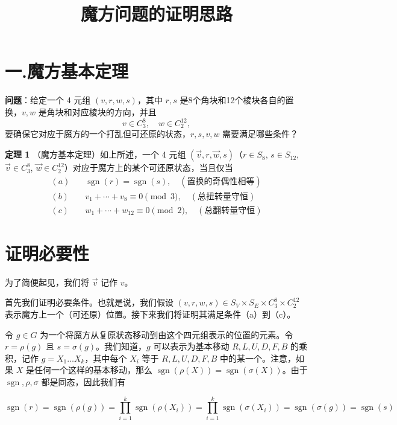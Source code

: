 \documentclass{article}
\title{魔方问题的证明思路}
\author{}
\date{}
\begin{document}
\maketitle

\section*{一.魔方基本定理}

\textbf{问题}：给定一个 4 元组 \( (v, r, w, s) \)，其中 \( r, s \) 是8个角块和12个棱块各自的置换，\( v, w \) 是角块和对应棱块的方向，并且
\[
v \in C_3^8, \quad w \in C_2^{12},
\]
要确保它对应于魔方的一个打乱但可还原的状态，\( r, s, v, w \) 需要满足哪些条件？



\textbf{定理 1} （魔方基本定理）如上所述，一个 4 元组 \( (\vec{v}, r, \vec{w}, s) \)（\( r \in S_8 \), \( s \in S_{12} \), \( \vec{v} \in C_3^8 \), \( \vec{w} \in C_2^{12} \)）对应于魔方上的某个可还原状态，当且仅当
\[
\begin{aligned}
(a) &\quad \operatorname{sgn}(r) = \operatorname{sgn}(s), \quad (\text{置换的奇偶性相等}) \\
(b) &\quad v_1 + \cdots + v_8 \equiv 0 \pmod{3}, \quad (\text{总扭转量守恒}) \\
(c) &\quad w_1 + \cdots + w_{12} \equiv 0 \pmod{2}, \quad (\text{总翻转量守恒})
\end{aligned}
\]

\section*{证明必要性}

为了简便起见，我们将 \( \vec{v} \) 记作 \( v \)。

首先我们证明必要条件。也就是说，我们假设 \( (v, r, w, s) \in S_V \times S_E \times C_3^8 \times C_2^{12} \) 表示魔方上一个（可还原）位置。接下来我们将证明其满足条件（a）到（c）。

令 \( g \in G \) 为一个将魔方从复原状态移动到由这个四元组表示的位置的元素。令 \( r = \rho(g) \) 且 \( s = \sigma(g) \)。我们知道，\( g \) 可以表示为基本移动 \( R, L, U, D, F, B \) 的乘积，记作 \( g = X_1 \dots X_k \)，其中每个 \( X_i \) 等于 \( R, L, U, D, F, B \) 中的某一个。注意，如果 \( X \) 是任何一个这样的基本移动，那么 \( \operatorname{sgn}(\rho(X)) = \operatorname{sgn}(\sigma(X)) \)。由于 \( \operatorname{sgn}, \rho, \sigma \) 都是同态，因此我们有

\[
\operatorname{sgn}(r) = \operatorname{sgn}(\rho(g)) = \prod_{i=1}^k \operatorname{sgn}(\rho(X_i)) = \prod_{i=1}^k \operatorname{sgn}(\sigma(X_i)) = \operatorname{sgn}(\sigma(g)) = \operatorname{sgn}(s)
\]
\end{document}
